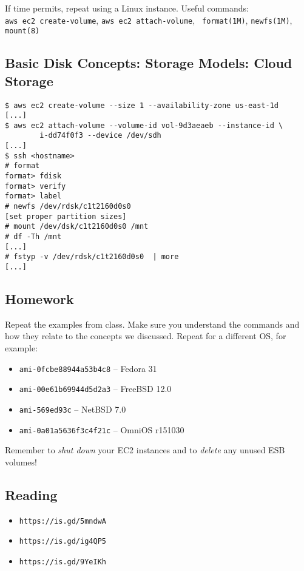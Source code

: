 \documentclass[xga]{xdvislides}
\begin{document}
If time permits, repeat using a Linux instance.
\vspace{.25in}
Useful commands: \\
{\tt aws ec2 create-volume}, {\tt aws ec2 attach-volume}, {\tt
format(1M)}, {\tt newfs(1M)}, {\tt mount(8)}

\subsection{Basic Disk Concepts: Storage Models: Cloud Storage}
\begin{verbatim}
$ aws ec2 create-volume --size 1 --availability-zone us-east-1d
[...]
$ aws ec2 attach-volume --volume-id vol-9d3aeaeb --instance-id \
        i-dd74f0f3 --device /dev/sdh
[...]
$ ssh <hostname>
# format
format> fdisk
format> verify
format> label
# newfs /dev/rdsk/c1t2160d0s0
[set proper partition sizes]
# mount /dev/dsk/c1t2160d0s0 /mnt
# df -Th /mnt
[...]
# fstyp -v /dev/rdsk/c1t2160d0s0  | more
[...]
\end{verbatim}


\subsection{Homework}
Repeat the examples from class.  Make sure you understand the commands and
how they relate to the concepts we discussed.  Repeat for a different OS,
for example: \\

\begin{itemize}
	\item {\tt ami-0fcbe88944a53b4c8} -- Fedora 31
	\item {\tt ami-00e61b69944d5d2a3} -- FreeBSD 12.0
	\item {\tt ami-569ed93c} -- NetBSD 7.0
	\item {\tt ami-0a01a5636f3c4f21c} -- OmniOS r151030
\end{itemize}

\vspace{.5in}
Remember to {\em shut down} your EC2 instances and to {\em delete} any unused ESB
volumes!



\subsection{Reading}
\begin{itemize}
	\item \verb+https://is.gd/5mndwA+
	\item \verb+https://is.gd/ig4QP5+
	\item \verb+https://is.gd/9YeIKh+
\end{itemize}
\end{document}
